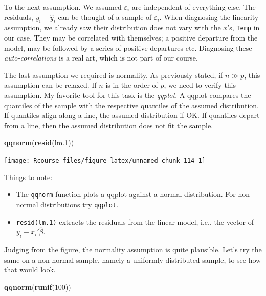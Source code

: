 \documentclass[]{book}
\newenvironment{Shaded}{\begin{snugshade}}{\end{snugshade}}
\newcommand{\KeywordTok}[1]{\textcolor[rgb]{0.13,0.29,0.53}{\textbf{#1}}}
\newcommand{\DecValTok}[1]{\textcolor[rgb]{0.00,0.00,0.81}{#1}}
\newcommand{\NormalTok}[1]{#1}
\providecommand{\tightlist}{%
  \setlength{\itemsep}{0pt}\setlength{\parskip}{0pt}}
\theoremstyle{definition}
\theoremstyle{definition}
\theoremstyle{definition}
\theoremstyle{remark}
\begin{document}
To the next assumption. We assumed \(\varepsilon_i\) are independent of
everything else. The residuals, \(y_i-\hat y_i\) can be thought of a
sample of \(\varepsilon_i\). When diagnosing the linearity assumption,
we already saw their distribution does not vary with the \(x\)'s,
\texttt{Temp} in our case. They may be correlated with themselves; a
positive departure from the model, may be followed by a series of
positive departures etc. Diagnosing these \emph{auto-correlations} is a
real art, which is not part of our course.

The last assumption we required is normality. As previously stated, if
\(n \gg p\), this assumption can be relaxed. If \(n\) is in the order of
\(p\), we need to verify this assumption. My favorite tool for this task
is the \emph{qqplot}. A qqplot compares the quantiles of the sample with
the respective quantiles of the assumed distribution. If quantiles align
along a line, the assumed distribution if OK. If quantiles depart from a
line, then the assumed distribution does not fit the sample.

\begin{Shaded}
\begin{Highlighting}[]
\KeywordTok{qqnorm}\NormalTok{(}\KeywordTok{resid}\NormalTok{(lm.}\DecValTok{1}\NormalTok{))}
\end{Highlighting}
\end{Shaded}

\texttt{[image: Rcourse\_files/figure-latex/unnamed-chunk-114-1]}

Things to note:

\begin{itemize}
\tightlist
\item
  The \texttt{qqnorm} function plots a qqplot against a normal
  distribution. For non-normal distributions try \texttt{qqplot}.
\item
  \texttt{resid(lm.1)} extracts the residuals from the linear model,
  i.e., the vector of \(y_i-x_i'\hat \beta\).
\end{itemize}

Judging from the figure, the normality assumption is quite plausible.
Let's try the same on a non-normal sample, namely a uniformly
distributed sample, to see how that would look.

\begin{Shaded}
\begin{Highlighting}[]
\KeywordTok{qqnorm}\NormalTok{(}\KeywordTok{runif}\NormalTok{(}\DecValTok{100}\NormalTok{))}
\end{Highlighting}
\end{Shaded}
\end{document}
